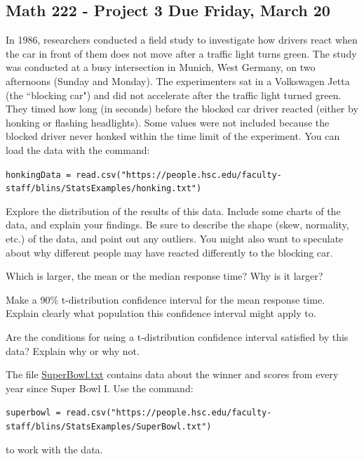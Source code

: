 \documentclass[11pt]{exam}
\begin{document}
\subsection*{Math 222 - Project 3 \hfill Due Friday, March 20}

\begin{questions}

\question In 1986, researchers conducted a field study to investigate how drivers react when the car in front of them does not move after a traffic light turns green. The study was conducted at a busy intersection in Munich, West Germany, on two afternoons (Sunday and Monday).  The experimenters sat in a Volkswagen Jetta (the ``blocking car") and did not accelerate after the traffic light turned green. They timed how long (in seconds) before the blocked car driver reacted 
(either by honking or flashing headlights).   
Some values were not included because the blocked driver never honked within the time limit of the experiment. You can load the data with the command:
\begin{center}
\footnotesize
\verb|honkingData = read.csv("https://people.hsc.edu/faculty-staff/blins/StatsExamples/honking.txt")|
\end{center}

\begin{parts}
\item Explore the distribution of the results of this data.  Include some charts of the data, and explain your findings. Be sure to describe the shape (skew, normality, etc.) of the data, and point out any outliers.  You might also want to speculate about why different people may have reacted differently to the blocking car.  

\item Which is larger, the mean or the median response time?  Why is it larger?  

\item Make a 90\% t-distribution confidence interval for the mean response time.  Explain clearly what population this confidence interval might apply to.  

\item Are the conditions for using a t-distribution confidence interval satisfied by this data?  Explain why or why not.  
\end{parts}

\question The file \href{https://people.hsc.edu/faculty-staff/blins/StatsExamples/SuperBowl.txt}{SuperBowl.txt} contains data about the winner and scores from every year since Super Bowl I.  Use the command:
\begin{center}
\footnotesize
\verb|superbowl = read.csv("https://people.hsc.edu/faculty-staff/blins/StatsExamples/SuperBowl.txt")|
\end{center}
to work with the data. 


\end{questions}
\end{document}
